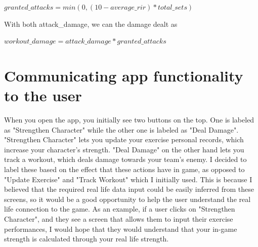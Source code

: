\documentclass{l4proj}
\begin{document}
\begin{algorithm}
  $granted\_attacks = min(0, (10 - average\_rir) * total\_sets)$
\end{algorithm}

With both attack\_damage, we can the damage dealt as 

\begin{algorithm}
  $workout\_damage = attack\_damage * granted\_attacks$ 
\end{algorithm}


\section{Communicating app functionality to the user}
When you open the app, you initially see two buttons on the top. One is labeled as "Strengthen Character" while the other one is labeled as "Deal Damage". "Strengthen Character" lets you update your exercise personal records, which increase your character's strength. "Deal Damage" on the other hand lets you track a workout, which deals damage towards your team's enemy. I decided to label these based on the effect that these actions have in game, as opposed to "Update Exercise" and "Track Workout" which I initially used. This is because I believed that the required real life data input could be easily inferred from these screens, so it would be a good opportunity to help the user understand the real life connection to the game. As an example, if a user clicks on "Strengthen Character", and they see a screen that allows them to input their exercise performances, I would hope that they would understand that your in-game strength is calculated through your real life strength.
\end{document}
